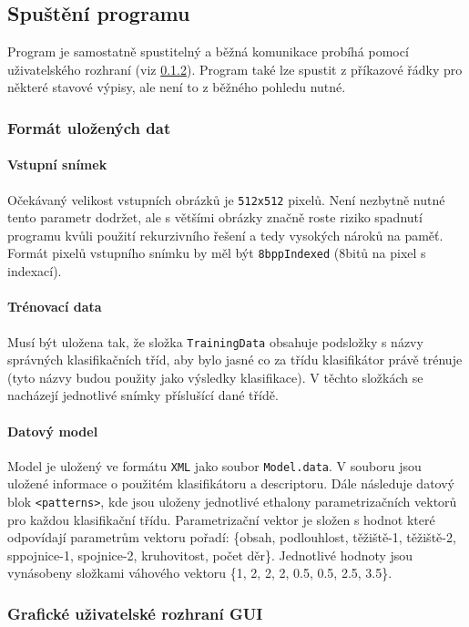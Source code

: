 \documentclass[12pt]{article}
\begin{document}
\subsection{Spuštění programu}
Program je samostatně spustitelný a běžná komunikace probíhá pomocí uživatelského rozhraní (viz \ref{GUI}).
Program také lze spustit z příkazové řádky pro některé stavové výpisy, ale není to z běžného pohledu nutné.

\subsubsection{Formát uložených dat}
\paragraph{Vstupní snímek}
Očekávaný velikost vstupních obrázků je \texttt{512x512} pixelů. Není nezbytně nutné tento parametr dodržet, ale s většími obrázky značně roste riziko spadnutí programu kvůli použití rekurzivního řešení a tedy vysokých nároků na paměť. Formát pixelů vstupního snímku by měl být \texttt{8bppIndexed} (8bitů na pixel s indexací).

\paragraph{Trénovací data}
Musí být uložena tak, že složka \texttt{TrainingData} obsahuje podsložky s názvy správných klasifikačních tříd, aby bylo jasné co za třídu klasifikátor právě trénuje (tyto názvy budou použity jako výsledky klasifikace). V těchto složkách se nacházejí jednotlivé snímky příslušící dané třídě.

\paragraph{Datový model}
Model je uložený ve formátu \texttt{XML} jako soubor \texttt{Model.data}. V souboru jsou uložené informace o použitém klasifikátoru a descriptoru. Dále následuje datový blok \texttt{<patterns>}, kde jsou uloženy jednotlivé ethalony parametrizačních vektorů pro každou klasifikační třídu. Parametrizační vektor je složen s hodnot které odpovídají parametrům vektoru  pořadí: \{obsah, podlouhlost, těžiště-1, těžiště-2, sppojnice-1, spojnice-2, kruhovitost, počet děr\}. Jednotlivé hodnoty jsou vynásobeny složkami váhového vektoru \{1, 2, 2, 2, 0.5, 0.5, 2.5, 3.5\}.


\pagebreak
\subsubsection{Grafické uživatelské rozhraní GUI}
\label{GUI}
\end{document}

